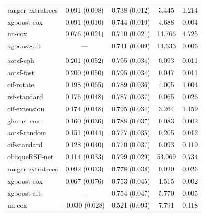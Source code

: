 \documentclass[12pt]{article}\usepackage[]{graphicx}\usepackage[]{xcolor}
\newenvironment{knitrout}{}{} %
\begin{document}
\begin{knitrout}
\begin{longtable}[t]{lcccc}
\hspace{1em}ranger-extratrees & 0.091 (0.008) & 0.738 (0.012) & 3.445 & 1.214\\
\hspace{1em}xgboost-cox & 0.091 (0.010) & 0.744 (0.010) & 4.688 & 0.004\\
\hspace{1em}nn-cox & 0.076 (0.021) & 0.710 (0.021) & 14.766 & 4.725\\
\hspace{1em}xgboost-aft & --- & 0.741 (0.009) & 14.633 & 0.006\\
\addlinespace[0.3em]
\multicolumn{5}{l}{\textit{\textbf{VA lung cancer trial; death, n = 137, p = 8}}}\\
\hline
\hspace{1em}aorsf-cph & 0.201 (0.052) & 0.795 (0.034) & 0.093 & 0.011\\
\hspace{1em}aorsf-fast & 0.200 (0.050) & 0.795 (0.034) & 0.047 & 0.011\\
\hspace{1em}cif-rotate & 0.198 (0.065) & 0.789 (0.036) & 4.005 & 1.004\\
\hspace{1em}rsf-standard & 0.176 (0.048) & 0.787 (0.037) & 0.065 & 0.026\\
\hspace{1em}cif-extension & 0.174 (0.048) & 0.795 (0.034) & 3.264 & 1.159\\
\hspace{1em}glmnet-cox & 0.160 (0.036) & 0.788 (0.037) & 0.083 & 0.002\\
\hspace{1em}aorsf-random & 0.151 (0.044) & 0.777 (0.035) & 0.205 & 0.012\\
\hspace{1em}cif-standard & 0.128 (0.040) & 0.770 (0.037) & 0.093 & 0.119\\
\hspace{1em}obliqueRSF-net & 0.114 (0.033) & 0.799 (0.029) & 53.069 & 0.734\\
\hspace{1em}ranger-extratrees & 0.092 (0.033) & 0.778 (0.038) & 0.020 & 0.026\\
\hspace{1em}xgboost-cox & 0.067 (0.076) & 0.753 (0.045) & 1.515 & 0.002\\
\hspace{1em}xgboost-aft & --- & 0.754 (0.047) & 5.770 & 0.005\\
\hspace{1em}nn-cox & -0.030 (0.028) & 0.521 (0.093) & 7.791 & 0.118\\*
\end{longtable}

\end{knitrout}
\end{document}

